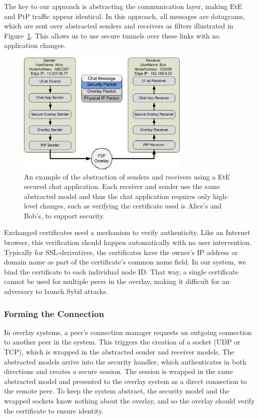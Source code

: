 \documentclass[conference]{IEEEtran}
\begin{document}
The key to our approach is abstracting the communication layer, making EtE and
PtP traffic appear identical. In this approach, all messages are datagrams, which are sent
over abstracted senders and receivers as filters illustrated in
Figure~\ref{fig:senders_receivers}.  This allows us to use secure tunnels over
these links with no application changes.

\begin{figure}[h]
\centering
\includegraphics[width=3.25in]{secure_sender_stack_generic.png.eps}
\caption{An example of the abstraction of senders and receivers using a EtE 
secured chat application.  Each receiver and sender use the same abstracted
model and thus the chat application requires only high-level changes, such
as verifying the certificate used is Alice's and Bob's, to support security.}
\label{fig:senders_receivers}
\end{figure}

Exchanged certificates need a mechanism to verify authenticity.  Like an
Internet browser, this verification should happen automatically with no user
intervention.  Typically for SSL-derivatives, the certificates have the owner's
IP address or domain name as part of the certificate's common name field.  In
our system, we bind the certificate to each individual node ID.  That way,
a single certificate cannot be used for multiple peers in the overlay, making
it difficult for an adversary to launch Sybil attacks.

\subsubsection{Forming the Connection}
In overlay systems, a peer's connection manager requests an outgoing
connection to another peer in the system.  This triggers the creation of a
socket (UDP or TCP), which is wrapped in the abstracted sender and receiver
models.  The abstracted models arrive into the security handler, which
authenticates in both directions and creates a secure session.  The session is
wrapped in the same abstracted model and presented to the overlay system as a
direct connection to the remote peer.  To keep the system abstract, the security
model and the wrapped sockets know nothing about the overlay, and so the overlay
should verify the certificate to ensure identity.
\end{document}
